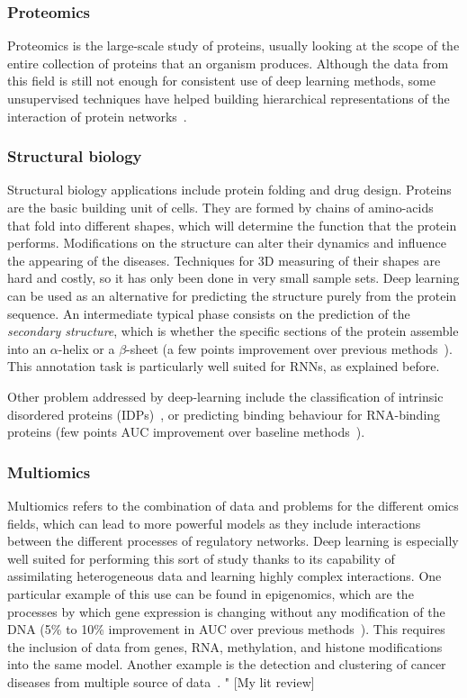 \subsubsection{Proteomics}
Proteomics is the large-scale study of proteins, usually looking at the scope of the entire collection of proteins that an organism produces. Although the data from this field is still not enough for consistent use of deep learning methods, some unsupervised techniques have helped building hierarchical representations of the interaction of protein networks~\cite{Chen2015}.

\subsubsection{Structural biology}
Structural biology applications include protein folding and drug design. Proteins are the basic building unit of cells. They are formed by chains of amino-acids that fold into different shapes, which will determine the function that the protein performs. Modifications on the structure can alter their dynamics and influence the appearing of the diseases. Techniques for 3D measuring of their shapes are hard and costly, so it has only been done in very small sample sets. Deep learning can be used as an alternative for predicting the structure purely from the protein sequence. An intermediate typical phase consists on the prediction of the \textit{secondary structure}, which is whether the specific sections of the protein assemble into an $\alpha$-helix or a $\beta$-sheet (a few points improvement  over previous methods~\cite{Jurtz2017}). This annotation task is particularly well suited for RNNs, as explained before.

Other problem addressed by deep-learning include the classification of intrinsic disordered proteins (IDPs)~\cite{Wang2015}, or predicting binding behaviour for RNA-binding proteins (few points AUC improvement over baseline methods~\cite{Zhang2015}).

\subsubsection{Multiomics}
Multiomics refers to the combination of data and problems for the different omics fields, which can lead to more powerful models as they include interactions between the different processes of regulatory networks. Deep learning is especially well suited for performing this sort of study thanks to its capability of assimilating heterogeneous data and learning highly complex interactions. One particular example of this use can be found in epigenomics, which are the processes by which gene expression is changing without any modification of the DNA (5\% to 10\% improvement in AUC over previous methods~\cite{Zhou2015}). This requires the inclusion of data from genes, RNA, methylation, and histone modifications into the same model. Another example is the detection and clustering of cancer diseases from multiple source of data~\cite{Liang2015}.
" [My lit review]

